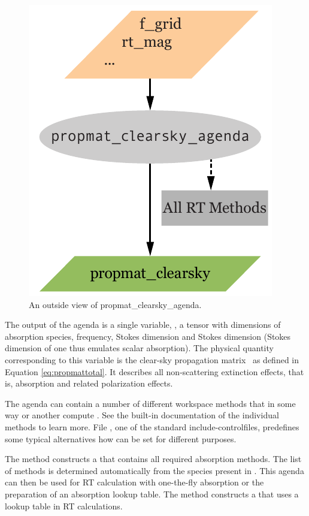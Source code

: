 \begin{figure}
 \begin{center}
  \includegraphics[scale=0.7]{propmat_clearsky_agenda}
  \caption{An outside view of propmat\_clearsky\_agenda.}
  \label{fig:absorption:pmat_outside}
 \end{center}
\end{figure}

The output of the agenda is a single variable,
, a tensor with dimensions of absorption
species, frequency, Stokes dimension and Stokes dimension (Stokes
dimension of one thus emulates scalar absorption).  The physical
quantity corresponding to this variable is the clear-sky propagation
matrix \, as defined in Equation
\ref{eq:propmattotal}. It describes all non-scattering extinction
effects, that is, absorption and related polarization effects.

The agenda can contain a number of different workspace methods that in
some way or another compute . See the
built-in documentation of the individual methods to learn more. File
, one of the standard include-controlfiles,
predefines some typical alternatives how
 can be set for different
purposes.

The method  constructs
a  that contains all required
absorption methods. The list of methods is determined automatically
from the species present in . This agenda can
then be used for RT calculation with one-the-fly absorption or the
preparation of an absorption lookup table. The method
 constructs a
 that uses a lookup table in RT
calculations.

